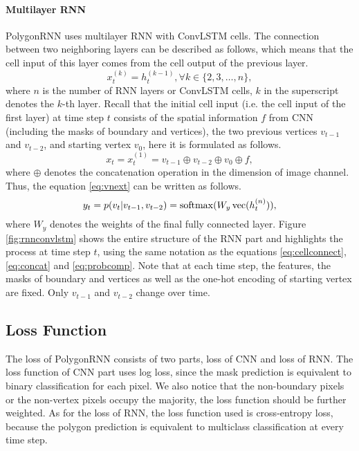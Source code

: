 

\paragraph{Multilayer RNN}
PolygonRNN uses multilayer RNN with ConvLSTM cells. The connection between two neighboring layers can be described as follows, which means that the cell input of this layer comes from the cell output of the previous layer.
\begin{equation}\label{eq:cellconnect}
	x_t^{(k)} = h_t^{(k-1)}, \forall k \in \{2,3,\ldots,n\},
\end{equation}
where $n$ is the number of RNN layers or ConvLSTM cells, $k$ in the superscript denotes the $k$-th layer. Recall that the initial cell input (i.e. the cell input of the first layer) at time step $t$ consists of the spatial information $f$ from CNN (including the masks of boundary and vertices), the two previous vertices $v_{t-1}$ and $v_{t-2}$, and starting vertex $v_0$, here it is formulated as follows.
\begin{equation}\label{eq:concat}
	x_t = x_t^{(1)} = v_{t-1} \oplus v_{t-2} \oplus v_0 \oplus f,
\end{equation}
where $\oplus$ denotes the concatenation operation in the dimension of image channel. Thus, the equation \ref{eq:vnext} can be written as follows.
\begin{equation}\label{eq:probcomp}
	y_t = p(v_t|v_{t-1}, v_{t-2}) = \operatorname{softmax}(W_y\operatorname{vec}(h_t^{(n)})),
\end{equation}
where $W_y$ denotes the weights of the final fully connected layer. Figure \ref{fig:rnnconvlstm} shows the entire structure of the RNN part and highlights the process at time step $t$, using the same notation as the equations \ref{eq:cellconnect}, \ref{eq:concat} and \ref{eq:probcomp}. Note that at each time step, the features, the masks of boundary and vertices as well as the one-hot encoding of starting vertex are fixed. Only $v_{t-1}$ and $v_{t-2}$ change over time.



\subsection{Loss Function}
The loss of PolygonRNN consists of two parts, loss of CNN and loss of RNN. The loss function of CNN part uses log loss, since the mask prediction is equivalent to binary classification for each pixel. We also notice that the non-boundary pixels or the non-vertex pixels occupy the majority, the loss function should be further weighted. As for the loss of RNN, the loss function used is cross-entropy loss, because the polygon prediction is equivalent to multiclass classification at every time step.

